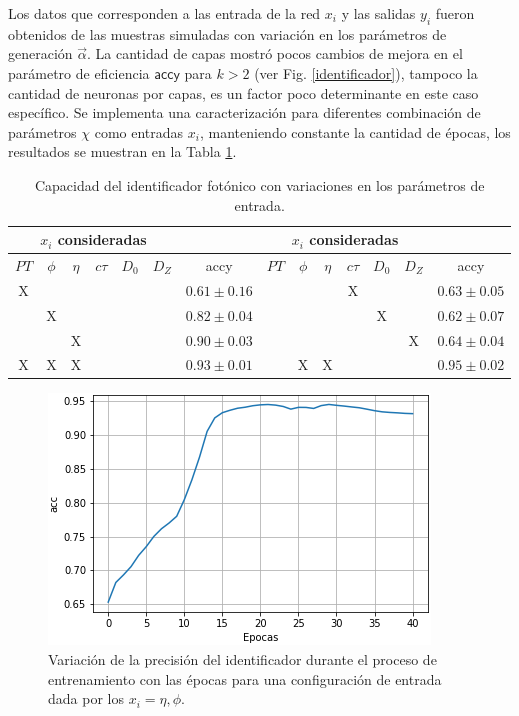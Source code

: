 Los datos que corresponden a las entrada de la red $x_i$ y las salidas $y_i$ fueron obtenidos de las muestras simuladas con variación en los parámetros de generación $\vec{\alpha}$. La cantidad de capas mostró pocos cambios de mejora en el parámetro de eficiencia $\textsf{accy} $ para $k>2$ (ver Fig. \ref{identificador}), tampoco la cantidad de neuronas por capas, es un factor poco determinante en este caso específico. Se implementa una caracterización para diferentes combinación de parámetros $\chi$ como entradas $x_i$, manteniendo constante la cantidad de épocas, los resultados se muestran en la Tabla 
\ref{ajuste1}.

\begin{table}[!h]
\footnotesize
\centering
\begin{tabular}{|cccccc|c||cccccc|c|}
\toprule
\multicolumn{6}{|c|}{$x_i$ consideradas} &  &
\multicolumn{6}{|c|}{$x_i$ consideradas} &  \\
\midrule
$PT$ & $\phi$ & $\eta$ & $c\tau$ & $D_0$ & $D_Z$  & \textsf{accy} &
$PT$ & $\phi$ & $\eta$ & $c\tau$ & $D_0$ & $D_Z$  & \textsf{accy} \\
\midrule
X &   &   &   &   &   & $0.61 \pm 0.16$ & 
  &   &   & X &   &   & $0.63 \pm 0.05$\\
  & X &   &   &   &   & $0.82 \pm 0.04$ & 
  &   &   &   & X &   & $0.62 \pm 0.07$\\  
  &   & X &   &   &   & $0.90 \pm 0.03$ & 
  &   &   &   &   & X & $0.64 \pm 0.04$\\
\bottomrule
X & X & X &  &  &  & $0.93 \pm 0.01$ &
 & X & X &  &  &  & $0.95 \pm 0.02$\\
\bottomrule 
\end{tabular}%
\caption{Capacidad del identificador fotónico con variaciones en los parámetros de entrada.}
\label{ajuste1}
\end{table}

\begin{figure}[!h]
\centering
\includegraphics[width=.5\textwidth]{Simulacion/imagenes/acc.png}
\caption{Variación de la precisión del identificador durante el proceso de entrenamiento con las épocas para una configuración de entrada dada por los $x_i = \eta, \phi$.}
\label{identificador0}
\end{figure}

